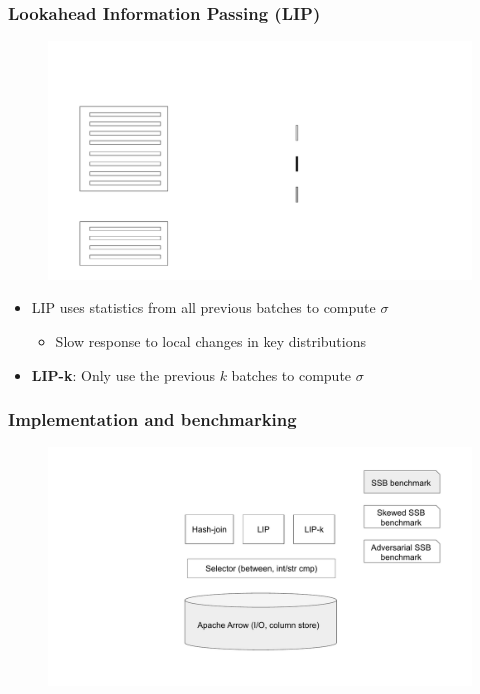 \documentclass{beamer}
\begin{document}
\begin{frame}[noframenumbering]
  \frametitle{Lookahead Information Passing (LIP)}
  \begin{figure}
    \centering
    \includegraphics[page={26},height=0.7\textheight,keepaspectratio]{lip-animation}
  \end{figure}
  \pause
  \begin{itemize}
    \item LIP uses statistics from all previous batches to compute $\sigma$
    \begin{itemize}
        \item Slow response to local changes in key distributions
    \end{itemize}
    \item \textbf{LIP-k}: Only use the previous $k$ batches to compute $\sigma$
  \end{itemize}
\end{frame}

\begin{frame}
  \frametitle{Implementation and benchmarking}
  \begin{figure}
    \centering
    \includegraphics[height=0.7\textheight,keepaspectratio]{implementation}
  \end{figure}
\end{frame}
\end{document}
